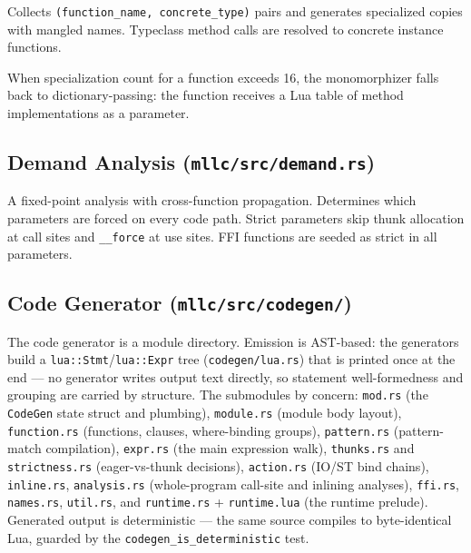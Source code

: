 \documentclass[11pt,a4paper]{article}
\begin{document}
Collects \texttt{(function\_name, concrete\_type)} pairs and generates
specialized copies with mangled names.  Typeclass method calls are resolved to
concrete instance functions.

When specialization count for a function exceeds 16, the monomorphizer falls back
to dictionary-passing: the function receives a Lua table of method
implementations as a parameter.

\subsection{Demand Analysis (\texttt{mllc/src/demand.rs})}

A fixed-point analysis with cross-function propagation.  Determines which
parameters are forced on every code path.  Strict parameters skip thunk
allocation at call sites and \texttt{\_\_force} at use sites.  FFI functions are
seeded as strict in all parameters.

\subsection{Code Generator (\texttt{mllc/src/codegen/})}

The code generator is a module directory.  Emission is AST-based: the
generators build a \texttt{lua::Stmt}/\texttt{lua::Expr} tree
(\texttt{codegen/lua.rs}) that is printed once at the end --- no
generator writes output text directly, so statement well-formedness
and grouping are carried by structure.  The submodules by concern:
\texttt{mod.rs} (the \texttt{CodeGen} state struct and plumbing),
\texttt{module.rs} (module body layout), \texttt{function.rs}
(functions, clauses, where-binding groups), \texttt{pattern.rs}
(pattern-match compilation), \texttt{expr.rs} (the main expression
walk), \texttt{thunks.rs} and \texttt{strictness.rs} (eager-vs-thunk
decisions), \texttt{action.rs} (IO/ST bind chains), \texttt{inline.rs},
\texttt{analysis.rs} (whole-program call-site and inlining analyses),
\texttt{ffi.rs}, \texttt{names.rs}, \texttt{util.rs}, and
\texttt{runtime.rs} + \texttt{runtime.lua} (the runtime prelude).
Generated output is deterministic --- the same source compiles to
byte-identical Lua, guarded by the \texttt{codegen\_is\_deterministic}
test.
\end{document}
